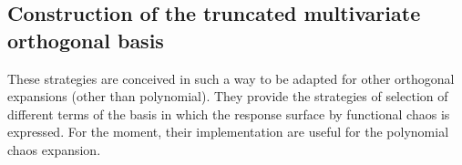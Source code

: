 \newpage
\subsection{Construction of the truncated multivariate orthogonal basis}

These strategies are conceived in such a way to be adapted for other orthogonal expansions (other than polynomial). They provide the strategies of selection of different terms of the basis in which the response surface by functional chaos is expressed. For the moment, their implementation are useful for the polynomial chaos expansion.




